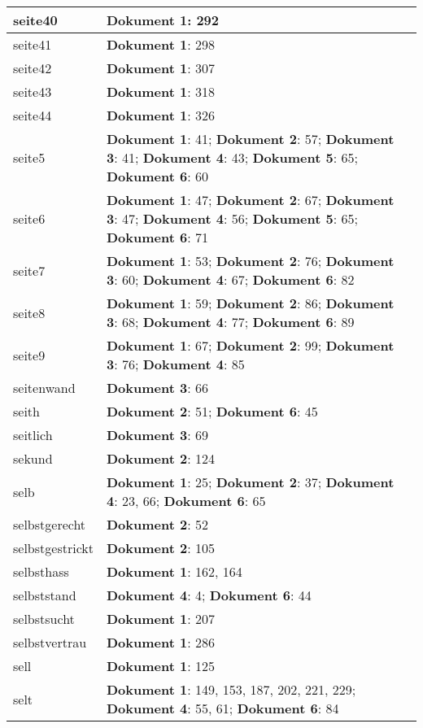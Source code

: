 \documentclass[a5paper]{article}
\begin{document}
\begin{longtable}[l]{|l|p{3in}|}
\hline
seite40 & \textbf{Dokument 1}: 292 \\
\hline
seite41 & \textbf{Dokument 1}: 298 \\
\hline
seite42 & \textbf{Dokument 1}: 307 \\
\hline
seite43 & \textbf{Dokument 1}: 318 \\
\hline
seite44 & \textbf{Dokument 1}: 326 \\
\hline
seite5 & \textbf{Dokument 1}: 41; \textbf{Dokument 2}: 57; \textbf{Dokument 3}: 41; \textbf{Dokument 4}: 43; \textbf{Dokument 5}: 65; \textbf{Dokument 6}: 60 \\
\hline
seite6 & \textbf{Dokument 1}: 47; \textbf{Dokument 2}: 67; \textbf{Dokument 3}: 47; \textbf{Dokument 4}: 56; \textbf{Dokument 5}: 65; \textbf{Dokument 6}: 71 \\
\hline
seite7 & \textbf{Dokument 1}: 53; \textbf{Dokument 2}: 76; \textbf{Dokument 3}: 60; \textbf{Dokument 4}: 67; \textbf{Dokument 6}: 82 \\
\hline
seite8 & \textbf{Dokument 1}: 59; \textbf{Dokument 2}: 86; \textbf{Dokument 3}: 68; \textbf{Dokument 4}: 77; \textbf{Dokument 6}: 89 \\
\hline
seite9 & \textbf{Dokument 1}: 67; \textbf{Dokument 2}: 99; \textbf{Dokument 3}: 76; \textbf{Dokument 4}: 85 \\
\hline
seitenwand & \textbf{Dokument 3}: 66 \\
\hline
seith & \textbf{Dokument 2}: 51; \textbf{Dokument 6}: 45 \\
\hline
seitlich & \textbf{Dokument 3}: 69 \\
\hline
sekund & \textbf{Dokument 2}: 124 \\
\hline
selb & \textbf{Dokument 1}: 25; \textbf{Dokument 2}: 37; \textbf{Dokument 4}: 23, 66; \textbf{Dokument 6}: 65 \\
\hline
selbstgerecht & \textbf{Dokument 2}: 52 \\
\hline
selbstgestrickt & \textbf{Dokument 2}: 105 \\
\hline
selbsthass & \textbf{Dokument 1}: 162, 164 \\
\hline
selbststand & \textbf{Dokument 4}: 4; \textbf{Dokument 6}: 44 \\
\hline
selbstsucht & \textbf{Dokument 1}: 207 \\
\hline
selbstvertrau & \textbf{Dokument 1}: 286 \\
\hline
sell & \textbf{Dokument 1}: 125 \\
\hline
selt & \textbf{Dokument 1}: 149, 153, 187, 202, 221, 229; \textbf{Dokument 4}: 55, 61; \textbf{Dokument 6}: 84 \\

\end{longtable}
\end{document}
